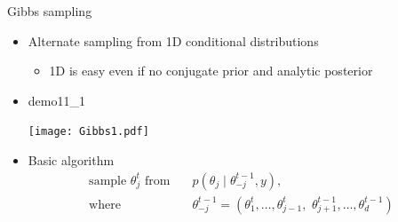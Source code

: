 \documentclass[finnish,english,t]{beamer}
\begin{document}

\begin{frame}{Gibbs sampling}

  \begin{itemize}
  \item Alternate sampling from 1D conditional distributions
    \begin{itemize}
    \item 1D is easy even if no conjugate prior and analytic posterior
    \end{itemize}
  \item<2-> demo11\_1\\
    \vspace{-.5\baselineskip}
     \begin{center}
       \texttt{[image: Gibbs1.pdf]}
     \end{center}
    \vspace{-.5\baselineskip}
     \item<3-> Basic algorithm {
      \begin{align*}
         \text{sample $\theta_j^t$ from} \quad & p(\theta_j \mid \theta_{-j}^{t-1}, y),\\
      \text{where} \quad
        & \theta^{t-1}_{-j}= (\theta^t_1,\dots,\theta^t_{j-1},\,\,
        \theta^{t-1}_{j+1},\dots,\theta^{t-1}_d)
      \end{align*}
      }
  \end{itemize}

\end{frame}
\end{document}
